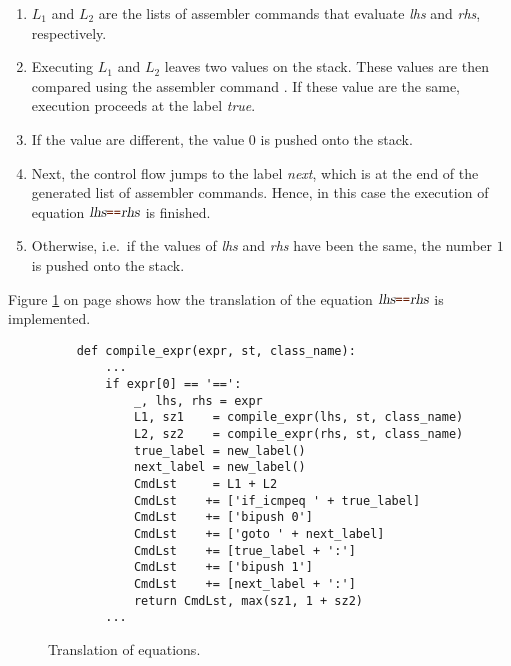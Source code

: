\begin{enumerate}
\item $L_1$ and $L_2$ are the lists of assembler commands that evaluate  \textsl{lhs} and \textsl{rhs}, respectively.
\item Executing $L_1$ and $L_2$ leaves two values on the stack.  These values are then compared using the
      assembler command .  If these value are the same, execution proceeds at the label
      \textsl{true}.
\item If the value are different, the value $0$ is pushed onto the stack.
\item Next, the control flow jumps to the label \textsl{next}, which is at the end of the generated
      list of assembler commands.  Hence, in this case the execution of equation
      $\textsl{lhs} \mytt{==} \textsl{rhs}$ is finished. 
\item Otherwise, i.e.~if the values of \textsl{lhs} and \textsl{rhs} have been the same, the number $1$
      is pushed onto the stack.
\end{enumerate}
Figure \ref{fig:Compiler.ipynb:compile:eq} on page \pageref{fig:Compiler.ipynb:compile:eq} shows how the
translation of the equation $\textsl{lhs} \mytt{==} \textsl{rhs}$ is implemented.  

\begin{figure}[!ht]
\centering
\begin{verbatim}
    def compile_expr(expr, st, class_name):
        ...
        if expr[0] == '==':
            _, lhs, rhs = expr
            L1, sz1    = compile_expr(lhs, st, class_name)
            L2, sz2    = compile_expr(rhs, st, class_name)
            true_label = new_label()
            next_label = new_label()
            CmdLst     = L1 + L2
            CmdLst    += ['if_icmpeq ' + true_label]
            CmdLst    += ['bipush 0']
            CmdLst    += ['goto ' + next_label]
            CmdLst    += [true_label + ':']
            CmdLst    += ['bipush 1']
            CmdLst    += [next_label + ':']
            return CmdLst, max(sz1, 1 + sz2)
        ...
\end{verbatim}
\vspace*{-0.3cm}
\caption{Translation of equations.}
\label{fig:Compiler.ipynb:compile:eq}
\end{figure}



